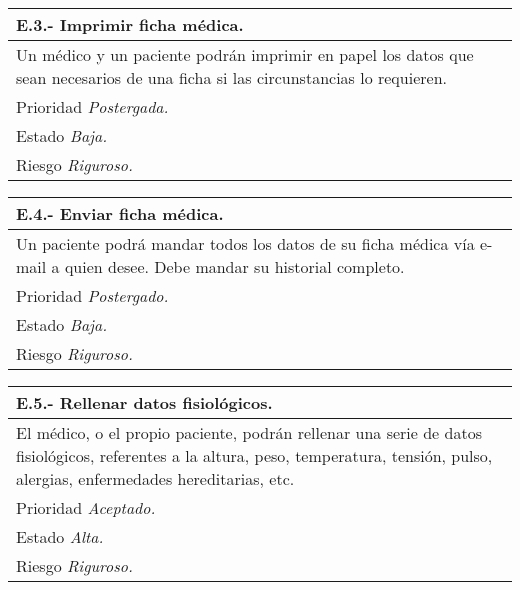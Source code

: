 \documentclass[a4paper,oneside,11pt]{book}
\begin{document}
\begin{center}
\begin{tabulary}{15cm}{|L|}
	\hline
		\bf{E.3.- Imprimir ficha médica.} \\
	\hline
		Un médico y un paciente podrán imprimir en papel los datos que sean necesarios de una ficha si las circunstancias lo requieren. \\
	\hline
		Prioridad \textit{Postergada.} \\
	\hline
		Estado \textit{Baja.} \\
	\hline
		Riesgo \textit{Riguroso.} \\
	\hline
\end{tabulary}
\end{center}

\begin{center}
\begin{tabulary}{15cm}{|L|}
	\hline
		\bf{E.4.- Enviar ficha médica.} \\
	\hline
		Un paciente podrá mandar todos los datos de su ficha médica vía e-mail a quien desee. Debe mandar su historial completo. \\
	\hline
		Prioridad \textit{Postergado.} \\
	\hline
		Estado \textit{Baja.} \\
	\hline
		Riesgo \textit{Riguroso.} \\
	\hline
\end{tabulary}
\end{center}

\begin{center}
\begin{tabulary}{15cm}{|L|}
	\hline
		\bf{E.5.- Rellenar datos fisiológicos.} \\
	\hline
		El médico, o el propio paciente, podrán rellenar una serie de datos fisiológicos, referentes a la altura, peso, temperatura, tensión, pulso, alergias, enfermedades hereditarias, etc. \\
	\hline
		Prioridad \textit{Aceptado.} \\
	\hline
		Estado \textit{Alta.} \\
	\hline
		Riesgo \textit{Riguroso.} \\
	\hline
\end{tabulary}
\end{center}
\end{document}
